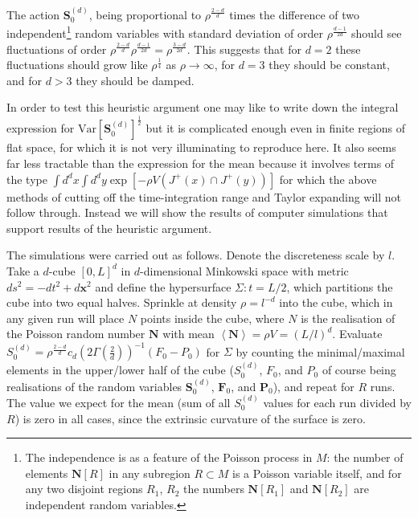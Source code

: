 \documentclass[12pt]{article}
\newcommand{\F}[1]{F_{#1}}
\renewcommand{\P}[1]{P_{#1}}
\newcommand{\BF}[1]{\mathbf{F}_{#1}}
\newcommand{\BP}[1]{\mathbf{P}_{#1}}
\begin{document}
The action $\textbf{S}^{ (d)}_{0}$, being proportional to $\rho^\frac{2-d}{d}$ times the difference of two independent\footnote{The independence is as a feature of the Poisson process in $M$: the number of elements $\textbf{N}[R]$ in any subregion $R\subset M$ is a Poisson variable itself, and for any two disjoint regions $R_1$, $R_2$ the numbers $\textbf{N}[R_1]$ and $\textbf{N}[R_2]$ are independent random variables.} random variables with standard deviation of order $\rho^\frac{d-1}{2d}$  should see fluctuations of order $\rho^\frac{2-d}{d}\rho^\frac{d-1}{2d}=\rho^\frac{3-d}{2d}$. This suggests that for $d=2$ these fluctuations should grow like $\rho^{\frac{1}{4}}$ as $\rho\rightarrow\infty$, for $d=3$ they should be constant, and for $d>3$ they should be damped.

In order to test this heuristic argument one may like to write down the integral expression for $\text{Var}[\textbf{S}^{ (d)}_0]^\frac12$ but it is complicated enough even in finite regions of flat space, for which it is not very illuminating to reproduce here. It also seems far less tractable than the expression for the mean because it involves terms of the type $\int d^dx\int d^dy \exp\left[-\rho V (J^+ (x)\cap J^+ (y))\right]$ for which the above methods of cutting off the time-integration range and Taylor expanding will not follow through. Instead we will show the results of computer simulations that support results of the heuristic argument. 


 
The simulations were carried out as follows. Denote the discreteness scale by $l$. Take a $d$-cube $[0,L]^d$ in $d$-dimensional Minkowski space with metric $ds^2=-dt^2+d{\mathbf x}^2$ and define the hypersurface $\Sigma: t=L/2$, which partitions the cube into two equal halves. Sprinkle at density $\rho=l^{-d}$ into the cube, which in any given run will place $N$ points inside the cube, where $N$ is the realisation of the Poisson random number $\textbf{N}$ with mean $\left\langle \textbf{N}\right\rangle = \rho V=  (L/l)^d$. Evaluate $S^{ (d)}_0=\rho^\frac{2-d}{d}c_d\left (2\Gamma\left (\frac{2}{d}\right)\right)^{-1} (\F{0} - \P{0})$ for $\Sigma$ by counting the minimal/maximal elements in the upper/lower half of the cube ($S^{ (d)}_0$, $\F{0}$, and $\P{0}$ of course being realisations of the random variables $\textbf{S}^{ (d)}_0$, $\BF{0}$, and $\BP{0}$), and repeat for $R$ runs. The value we expect for the mean (sum of all $S^{ (d)}_0$ values for each run divided by $R$) is zero in all cases, since the extrinsic curvature of the surface is zero.
\end{document}

